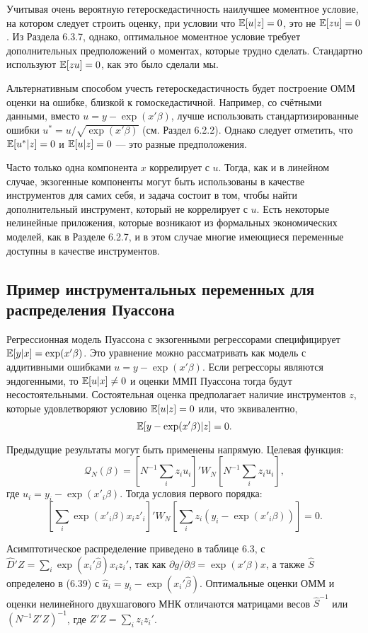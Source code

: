 Учитывая очень вероятную гетероскедастичность наилучшее моментное условие, на котором следует строить оценку, при условии что $\mathbb{E}[u|z]=0$, это не $\mathbb{E}[zu]=0$. Из Раздела 6.3.7, однако, оптимальное моментное условие требует дополнительных предположений о моментах, которые трудно сделать. Стандартно используют $\mathbb{E}[zu]=0$, как это было сделали мы.

Альтернативным способом учесть гетероскедастичность будет построение ОММ оценки на ошибке, близкой к гомоскедастичной. Например, со счётными данными, вместо $u=y-\exp(x'\beta)$, лучше использовать стандартизированные ошибки $u^*=u/\sqrt{\exp(x'\beta)}$ (см. Раздел 6.2.2). Однако следует отметить, что $\mathbb{E}[u^*|z]=0$ и $\mathbb{E}[u|z]=0$ --- это разные предположения.

Часто только одна компонента $x$ коррелирует с $u$. Тогда, как и в линейном случае, экзогенные компоненты могут быть использованы в качестве инструментов для самих себя, и задача состоит в том, чтобы найти дополнительный инструмент, который не коррелирует с $u$. Есть некоторые нелинейные приложения, которые возникают из формальных экономических моделей, как в Разделе 6.2.7, и в этом случае многие имеющиеся переменные доступны в качестве инструментов.

\subsection{Пример инструментальных переменных для распределения Пуассона}

Регрессионная модель Пуассона с экзогенными регрессорами специфицирует $\mathbb{E}[y|x]=\exp(x'\beta)$. Это уравнение можно рассматривать как модель с аддитивными ошибками $u=y-\exp(x'\beta)$. Если регрессоры являются эндогенными, то $\mathbb{E}[u|x] \not=0$ и оценки ММП Пуассона тогда будут несостоятельными. Состоятельная оценка предполагает наличие инструментов $z$, которые удовлетворяют условию $\mathbb{E}[u|z]=0$ или, что эквивалентно,
\[
\mathbb{E}[y-\exp(x'\beta)|z]=0.
\]

Предыдущие результаты могут быть применены напрямую. Целевая функция:
\[
\mathcal{Q}_{N}(\beta)= \left[ N^{-1} \sum_i z_i u_i \right]' W_N \left[ N^{-1} \sum_i z_i u_i \right],
\]
где $u_i=y_i-\exp(x'_i\beta)$. Тогда условия первого порядка:
\[
\left[ \sum_i \exp(x'_i \beta) x_i z'_i \right]' W_N \left[ \sum_i z_i (y_i -\exp(x'_i \beta))\right]=0.
\]

Асимптотическое распределение приведено в таблице 6.3, с $\hat{D}'Z = \sum_i \exp(x_i'\hat{\beta}) x_i z_i'$, так как $\partial{g}/\partial{\beta} = \exp(x'\beta)x$, а также $\hat{S}$ определено в (6.39) с $\hat{u}_i = y_i - \exp(x_i'\hat{\beta})$. Оптимальные оценки ОММ и оценки нелинейного двухшагового МНК отличаются матрицами весов $\hat{S}^{-1}$ или $(N^{-1}Z'Z)^{-1}$, где $Z'Z = \sum_i z_iz_i'$.

